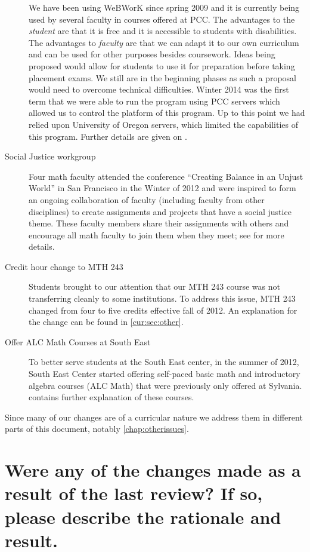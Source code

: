 \begin{description}
    We have been using WeBWorK since spring 2009 and it is currently being used by several faculty in courses
    offered at PCC.  The advantages to the \emph{student} are that it is free and it is
    accessible to students with disabilities.   The advantages to \emph{faculty} are that
    we can adapt it to our own curriculum and can be used for other purposes
    besides coursework.   Ideas being proposed would allow for students to
    use it for preparation before taking placement exams.  We still are in the
    beginning phases as such a proposal would need to overcome technical
    difficulties.   Winter 2014 was the first term that we were able to
    run the program using PCC servers which allowed us to control the platform
    of this program.  Up to this point we had relied upon University of Oregon
    servers, which limited the capabilities of this program. Further details 
    are given on .
  \item[Social Justice workgroup] Four math faculty attended the conference
    ``Creating Balance in an Unjust World'' in San Francisco in the Winter of 2012
    and were inspired to form an ongoing collaboration of faculty (including faculty from other disciplines) to create
    assignments and projects that have a social justice theme.  These faculty
    members share their assignments with others and encourage all math faculty
    to join them when they meet; see  for 
    more details.
  \item[Credit hour change to MTH 243] Students brought to our attention that our
    MTH 243 course was not transferring cleanly to some institutions.  To
    address this issue, MTH 243 changed from four to five credits effective fall
    of 2012.  An explanation for the change can be found in \vref{cur:sec:other}.
  \item[Offer ALC Math Courses at South East] To better serve students at the South
    East center, in the summer of 2012, South East Center started offering
    self-paced basic math and introductory algebra courses (ALC Math) that were previously only offered at
    Sylvania.  
    contains further explanation of these courses. 
\end{description}
Since many of our changes are of a curricular nature we address them in
different parts of this document, notably \vref{chap:otherissues}.


\section{Were any of the changes made as a result of the last review? If so,
please describe the rationale and result.}\label{over:sec:changesresult}

